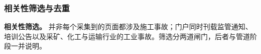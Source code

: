 \documentclass[11pt]{article}
\begin{document}
\subsubsection{{\cjkfont 相\allowbreak 关\allowbreak 性\allowbreak 筛\allowbreak 选\allowbreak 与\allowbreak 去\allowbreak 重}}
\textbf{{\cjkfont 相\allowbreak 关\allowbreak 性\allowbreak 筛\allowbreak 选\allowbreak 。}} {\cjkfont 并\allowbreak 非\allowbreak 每\allowbreak 个\allowbreak 采\allowbreak 集\allowbreak 到\allowbreak 的\allowbreak 页\allowbreak 面\allowbreak 都\allowbreak 涉\allowbreak 及\allowbreak 施\allowbreak 工\allowbreak 事\allowbreak 故\allowbreak ；\allowbreak 门\allowbreak 户\allowbreak 同\allowbreak 时\allowbreak 刊\allowbreak 载\allowbreak 监\allowbreak 管\allowbreak 通\allowbreak 知\allowbreak 、\allowbreak 培\allowbreak 训\allowbreak 公\allowbreak 告\allowbreak 以\allowbreak 及\allowbreak 采\allowbreak 矿\allowbreak 、\allowbreak 化\allowbreak 工\allowbreak 与\allowbreak 运\allowbreak 输\allowbreak 行\allowbreak 业\allowbreak 的\allowbreak 工\allowbreak 业\allowbreak 事\allowbreak 故\allowbreak 。\allowbreak 筛\allowbreak 选\allowbreak 分\allowbreak 两\allowbreak 道\allowbreak 闸\allowbreak 门\allowbreak ，\allowbreak 后\allowbreak 者\allowbreak 与\allowbreak 管\allowbreak 道\allowbreak 阶\allowbreak 段\allowbreak 一\allowbreak 并\allowbreak 说\allowbreak 明\allowbreak 。}
\end{document}
